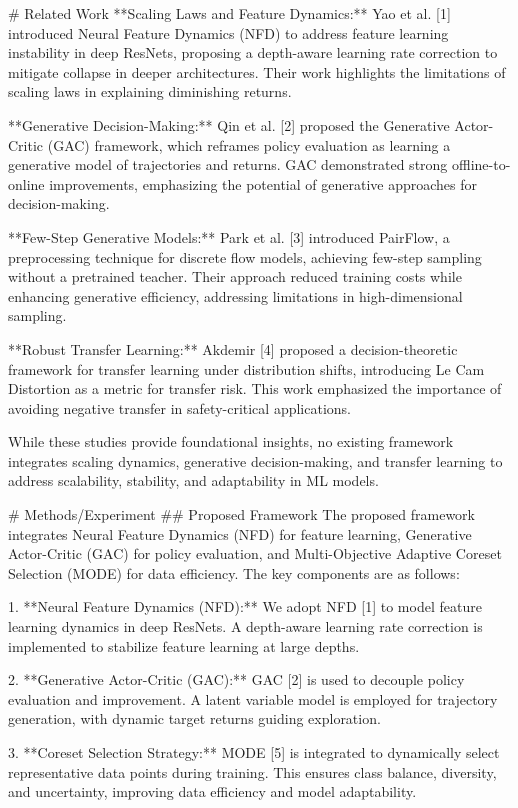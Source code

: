 # Related Work  
**Scaling Laws and Feature Dynamics:** Yao et al. [1] introduced Neural Feature Dynamics (NFD) to address feature learning instability in deep ResNets, proposing a depth-aware learning rate correction to mitigate collapse in deeper architectures. Their work highlights the limitations of scaling laws in explaining diminishing returns.  

**Generative Decision-Making:** Qin et al. [2] proposed the Generative Actor-Critic (GAC) framework, which reframes policy evaluation as learning a generative model of trajectories and returns. GAC demonstrated strong offline-to-online improvements, emphasizing the potential of generative approaches for decision-making.  

**Few-Step Generative Models:** Park et al. [3] introduced PairFlow, a preprocessing technique for discrete flow models, achieving few-step sampling without a pretrained teacher. Their approach reduced training costs while enhancing generative efficiency, addressing limitations in high-dimensional sampling.  

**Robust Transfer Learning:** Akdemir [4] proposed a decision-theoretic framework for transfer learning under distribution shifts, introducing Le Cam Distortion as a metric for transfer risk. This work emphasized the importance of avoiding negative transfer in safety-critical applications.

While these studies provide foundational insights, no existing framework integrates scaling dynamics, generative decision-making, and transfer learning to address scalability, stability, and adaptability in ML models.

# Methods/Experiment  
## Proposed Framework  
The proposed framework integrates Neural Feature Dynamics (NFD) for feature learning, Generative Actor-Critic (GAC) for policy evaluation, and Multi-Objective Adaptive Coreset Selection (MODE) for data efficiency. The key components are as follows:  

1. **Neural Feature Dynamics (NFD):** We adopt NFD [1] to model feature learning dynamics in deep ResNets. A depth-aware learning rate correction is implemented to stabilize feature learning at large depths.  

2. **Generative Actor-Critic (GAC):** GAC [2] is used to decouple policy evaluation and improvement. A latent variable model is employed for trajectory generation, with dynamic target returns guiding exploration.  

3. **Coreset Selection Strategy:** MODE [5] is integrated to dynamically select representative data points during training. This ensures class balance, diversity, and uncertainty, improving data efficiency and model adaptability.  

